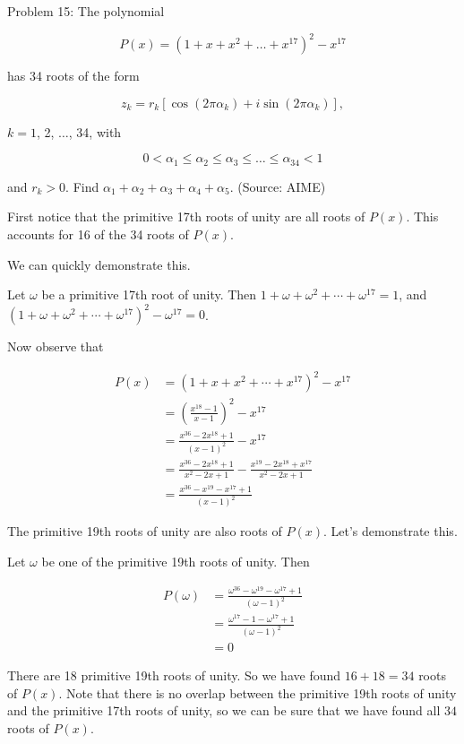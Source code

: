 Problem 15: The polynomial

\[P(x) = (1 + x + x^2 + \dots + x^{17})^2 - x^{17} \]

has 34 roots of the form

\[z_k = r_k [\cos (2 \pi \alpha_k) + i \sin (2 \pi \alpha_k)], \]

$k = 1$, 2, $\ldots$, 34, with

\[0 < \alpha_1 \le \alpha_2 \le \alpha_3 \le \dots \le \alpha_{34} < 1 \]

and $r_k > 0$. Find $\alpha_1 + \alpha_2 + \alpha_3 + \alpha_4 + \alpha_5$. (Source: AIME)

First notice that the primitive 17th roots of unity are all roots of $P(x)$. This accounts for 16 of the 34 roots of $P(x)$.

We can quickly demonstrate this.

Let $\omega$ be a primitive 17th root of unity. Then $1 + \omega + \omega^2 + \cdots + \omega^{17} = 1$, and $(1 + \omega + \omega^2 + \cdots + \omega^{17})^2 - \omega^{17} = 0$.

Now observe that

\begin{align*}
P(x) &= (1 + x + x^2 + \cdots + x^{17})^2 - x^{17} \\
&= \left(\frac{x^{18} - 1}{x - 1}\right)^2 - x^{17} \\
&= \frac{x^{36} - 2x^{18} + 1}{(x - 1)^2} - x^{17} \\
&= \frac{x^{36} - 2x^{18} + 1}{x^2 - 2x + 1} - \frac{x^{19} - 2x^{18} + x^{17}}{x^2 - 2x + 1} \\
&= \frac{x^{36} - x^{19} - x^{17} + 1}{(x-1)^2}
\end{align*}

The primitive 19th roots of unity are also roots of $P(x)$. Let's demonstrate this.

Let $\omega$ be one of the primitive 19th roots of unity. Then

\begin{align*}
P(\omega) &= \frac{\omega^{36} - \omega^{19} - \omega^{17} + 1}{(\omega-1)^2} \\
&= \frac{\omega^{17} - 1 - \omega^{17} + 1}{(\omega-1)^2} \\
&= 0
\end{align*}

There are 18 primitive 19th roots of unity. So we have found $16 + 18 = 34$ roots of $P(x)$. Note that there is no overlap between the primitive 19th roots of unity and the primitive 17th roots of unity, so we can be sure that we have found all $34$ roots of $P(x)$.


